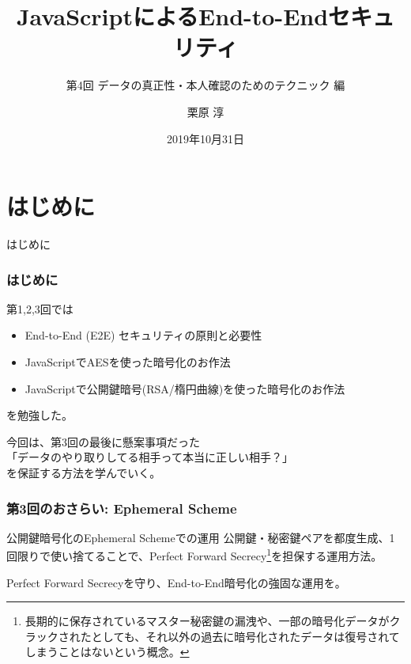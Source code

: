 \documentclass[12pt,dvipdfmx]{beamer}
\title[E2E Security with JS 04]{JavaScriptによるEnd-to-Endセキュリティ}
\subtitle{第4回 データの真正性・本人確認のためのテクニック 編}
\author[Jun Kurihara]{栗原 淳}
\institute[]{}
\date[Oct. 31, 2019]{2019年10月31日}
\begin{document}
\begin{frame}
\titlepage
\end{frame}

\section{はじめに}
\begin{frame}
 \centering
 {\Large はじめに}
\end{frame}

\begin{frame}
\frametitle{はじめに}
第1,2,3回では
\begin{itemize}
 \item End-to-End (E2E) セキュリティの原則と必要性
 \item JavaScriptでAESを使った暗号化のお作法
 \item JavaScriptで公開鍵暗号(RSA/楕円曲線)を使った暗号化のお作法
\end{itemize}
を勉強した。

\vspace{2ex}

今回は、第3回の最後に懸案事項だった\\
\alert{「データのやり取りしてる相手って本当に正しい相手？」}\\
を保証する方法を学んでいく。
\end{frame}


\begin{frame}
\frametitle{第3回のおさらい: Ephemeral Scheme}
\begin{block}{\small 公開鍵暗号化のEphemeral Schemeでの運用}
公開鍵・秘密鍵ペアを都度生成、1回限りで使い捨てることで、\alert{Perfect Forward Secrecy}\footnote[frame]{\scriptsize 長期的に保存されているマスター秘密鍵の漏洩や、一部の暗号化データがクラックされたとしても、\alert{それ以外の過去に暗号化されたデータは復号されてしまうことはない}という概念。}を担保する運用方法。
\end{block}

Perfect Forward Secrecyを守り、End-to-End暗号化の強固な運用を。
\end{frame}
\end{document}
